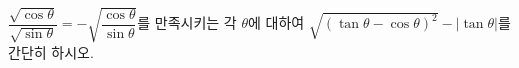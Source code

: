 $\dfrac{\sqrt{\cos\theta}}{\sqrt{\sin\theta}}=-\sqrt{\dfrac{\cos\theta}{\sin\theta}}$를 만족시키는 각 $\theta$에 대하여 $\sqrt{(\tan\theta-\cos\theta)^2}-|\tan\theta|$를 간단히 하시오. 
